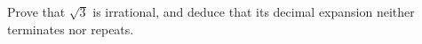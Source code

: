 Prove that $\sqrt3$ is irrational, and deduce that its decimal expansion neither terminates nor repeats.
